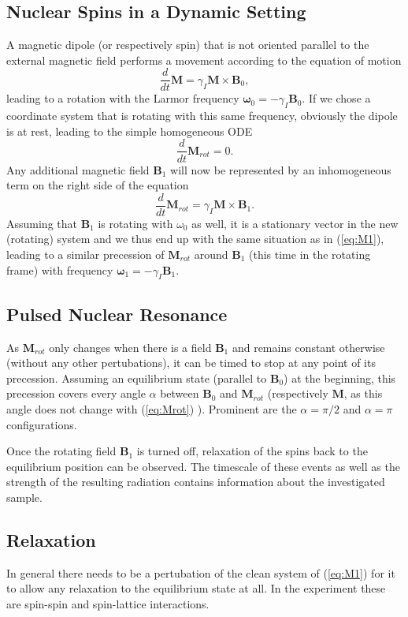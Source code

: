 \documentclass[a4paper]{scrartcl}
\numberwithin{equation}{section}
\numberwithin{figure}{section}
\numberwithin{table}{section}
\newcommand{\eq}[2]{\begin{equation}#1\label{#2}\end{equation}}
\newcommand{\ve}[1]{\mathbf{ #1} }
\begin{document}
\subsection{Nuclear Spins in a Dynamic Setting}
A magnetic dipole (or respectively spin) that is not oriented parallel to the external magnetic field performs a movement according to the equation of motion
\eq{\frac{d}{dt}\ve M = \gamma_I \ve M \times \ve B_0 ,}{eq:M1}
leading to a rotation with the Larmor frequency $\ve \omega_0 = -\gamma_I \ve B_0$. If we chose a coordinate system that is rotating with this same frequency, obviously the dipole is at rest, leading to the simple homogeneous ODE
\eq{\frac{d}{dt}\ve M_{rot} = 0.}{eq:Mrot}
Any additional magnetic field $\ve B_1$ will now be represented by an inhomogeneous term on the right side of the equation
\eq{\frac{d}{dt}\ve M_{rot} = \gamma_I \ve M \times \ve B_1.}{}
Assuming that $\ve B_1$ is rotating with $\omega_0$ as well, it is a stationary vector in the new (rotating) system and we thus end up with the same situation as in (\ref{eq:M1}), leading to a similar precession of $\ve M_{rot}$ around $\ve B_1$ (this time in the rotating frame) with frequency $\ve \omega_1 = -\gamma_I \ve B_1$.


\subsection{Pulsed Nuclear Resonance}
As $\ve M_{rot}$ only changes when there is a field $\ve B_1$ and remains constant otherwise (without any other pertubations), it can be timed to stop at any point of its precession. Assuming an equilibrium state (parallel to $\ve B_0$) at the beginning, this precession covers every angle $\alpha$ between $\ve B_0$ and $\ve M_{rot}$ (respectively $\ve M$, as this angle does not change with (\ref{eq:Mrot}) ). Prominent are the $\alpha = \pi/2$ and $\alpha = \pi$ configurations.

Once the rotating field $\ve B_1$ is turned off, relaxation of the spins back to the equilibrium position can be observed. The timescale of these events as well as the strength of the resulting radiation contains information about the investigated sample.


\subsection{Relaxation}
\label{sec:relax}
In general there needs to be a pertubation of the clean system of (\ref{eq:M1}) for it to allow any relaxation to the equilibrium state at all. In the experiment these are spin-spin and spin-lattice interactions.
\end{document}
